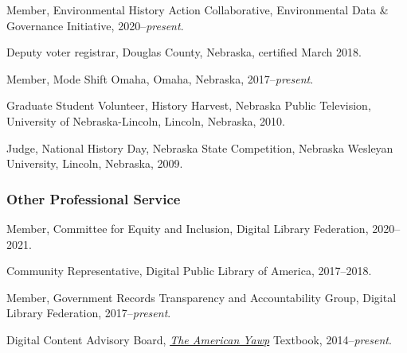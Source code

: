 Member, Environmental History Action Collaborative, Environmental Data
\& Governance Initiative, 2020--\emph{present}.

Deputy voter registrar, Douglas County, Nebraska, certified March 2018.

Member, Mode Shift Omaha, Omaha, Nebraska, 2017--\emph{present}.

Graduate Student Volunteer, History Harvest, Nebraska Public Television,
University of Nebraska-Lincoln, Lincoln, Nebraska, 2010.

Judge, National History Day, Nebraska State Competition, Nebraska
Wesleyan University, Lincoln, Nebraska, 2009.

\subsubsection{Other Professional
Service}\label{other-professional-service}

Member, Committee for Equity and Inclusion, Digital Library Federation,
2020--2021.

Community Representative, Digital Public Library of America, 2017--2018.

Member, Government Records Transparency and Accountability Group,
Digital Library Federation, 2017--\emph{present}.

Digital Content Advisory Board, \emph{\href{http://americanyawp.com}{The
American Yawp}} Textbook, 2014--\emph{present}.
